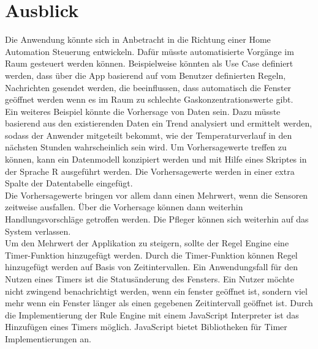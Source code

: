 \chapter{Ausblick}

Die Anwendung könnte sich in Anbetracht in die Richtung einer Home Automation Steuerung entwickeln. Dafür müsste automatisierte Vorgänge im Raum gesteuert werden können. Beispielweise könnten als Use Case definiert werden, dass über die App basierend auf vom Benutzer definierten Regeln, Nachrichten gesendet werden, die beeinflussen, dass automatisch die Fenster geöffnet werden wenn es im Raum zu schlechte Gaskonzentrationswerte gibt.\\
Ein weiteres Beispiel könnte die Vorhersage von Daten sein. Dazu müsste basierend aus den existierenden Daten ein Trend analysiert und ermittelt werden, sodass der Anwender mitgeteilt bekommt, wie der Temperaturverlauf in den nächsten Stunden wahrscheinlich sein wird. Um Vorhersagewerte treffen zu können, kann ein Datenmodell konzipiert werden und mit Hilfe eines Skriptes in der Sprache R ausgeführt werden. Die Vorhersagewerte werden in einer extra Spalte der Datentabelle eingefügt.\\
Die Vorhersagewerte bringen vor allem dann einen Mehrwert, wenn die Sensoren zeitweise ausfallen. Über die Vorhersage können dann weiterhin Handlungsvorschläge getroffen werden. Die Pfleger können sich weiterhin auf das System verlassen.\\
Um den Mehrwert der Applikation zu steigern, sollte der Regel Engine eine Timer-Funktion hinzugefügt werden. Durch die Timer-Funktion können Regel hinzugefügt werden auf Basis von Zeitintervallen. Ein Anwendungsfall für den Nutzen eines Timers ist die Statusänderung des Fensters. Ein Nutzer möchte nicht zwingend benachrichtigt werden, wenn ein fenster geöffnet ist, sondern viel mehr wenn ein Fenster länger als einen gegebenen Zeitintervall geöffnet ist. Durch die Implementierung der Rule Engine mit einem JavaScript Interpreter ist das Hinzufügen eines Timers möglich. JavaScript bietet Bibliotheken für Timer Implementierungen an.\\

